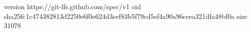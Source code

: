 version https://git-lfs.github.com/spec/v1
oid sha256:1c474382813d2250e6f0e624d3eef83b5f79cd5ef4a90a96ceea321dfa48bf0a
size 31078
